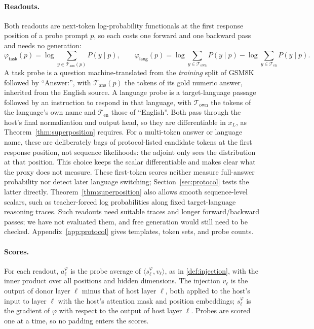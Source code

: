 \documentclass{article}
\theoremstyle{plain}
\theoremstyle{definition}
\theoremstyle{remark}
\newcommand{\util}{\mathsf{task}}
\newcommand{\risk}{\mathsf{lang}}
\begin{document}
\paragraph{Readouts.}
Both readouts are next-token log-probability functionals at the first response
position of a probe prompt $p$, so each costs one forward and one backward pass
and needs no generation:
\begin{equation}
\label{eq:readouts}
\varphi_\util(p)=\log\!\sum_{y\in\mathcal{T}_{\mathrm{ans}}(p)}\!P(y\mid p),
\qquad
\varphi_\risk(p)=\log\!\sum_{y\in\mathcal{T}_{\mathrm{own}}}\!P(y\mid p)-\log\!\sum_{y\in\mathcal{T}_{\mathrm{en}}}\!P(y\mid p).
\end{equation}
A task probe is a question machine-translated from the \emph{training} split of
GSM8K \citep{cobbe2021gsm8k} followed by ``Answer:'', with
$\mathcal{T}_{\mathrm{ans}}(p)$ the tokens of its gold numeric answer, inherited
from the English source. A language probe is a target-language passage followed
by an instruction to respond in that language, with $\mathcal{T}_{\mathrm{own}}$
the tokens of the language's own name and $\mathcal{T}_{\mathrm{en}}$ those of
``English''. Both pass through the host's final normalization and output head, so
they are differentiable in $x_L$, as Theorem~\ref{thm:superposition} requires.
For a multi-token answer or language name, these are deliberately bags of
protocol-listed candidate tokens at the first response position, not sequence
likelihoods: the adjoint only sees the distribution at that position. This
choice keeps the scalar differentiable and makes clear what the proxy does not
measure.
These first-token scores neither measure full-answer probability nor detect
later language switching; Section~\ref{sec:protocol} tests the latter directly.
Theorem~\ref{thm:superposition} also allows smooth sequence-level scalars, such
as teacher-forced log probabilities along fixed target-language reasoning
traces. Such readouts need suitable traces and longer forward/backward passes;
we have not evaluated them, and free generation would still need to be checked.
Appendix~\ref{app:protocol} gives templates, token sets, and probe counts.

\paragraph{Scores.}
For each readout, $a^{\varphi}_\ell$ is the probe average of
$\langle s^{\varphi}_\ell,v_\ell\rangle$, as in \eqref{def:injection}, with the
inner product over all positions and hidden dimensions. The injection $v_\ell$ is
the output of donor layer $\ell$ minus that of host layer $\ell$, both applied to
the host's input to layer $\ell$ with the host's attention mask and position
embeddings; $s^{\varphi}_\ell$ is the gradient of $\varphi$ with respect to the
output of host layer $\ell$. Probes are scored one at a time, so no padding
enters the scores.
\end{document}
